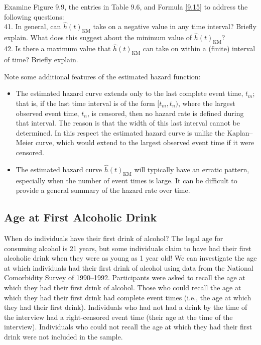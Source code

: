 \documentclass[
]{book}
\providecommand{\tightlist}{%
  \setlength{\itemsep}{0pt}\setlength{\parskip}{0pt}}
\begin{document}
Examine Figure 9.9, the entries in Table 9.6, and Formula \ref{9.15} to address the following questions:\\
41. In general, can \(\hat h(t)_{\mathrm{KM}}\) take on a negative value in any time interval? Briefly explain. What does this suggest about the minimum value of \(\hat h(t)_{\mathrm{KM}}\)?\\
42. Is there a maximum value that \(\hat h(t)_{\mathrm{KM}}\) can take on within a (finite) interval of time? Briefly explain.

Note some additional features of the estimated hazard function:

\begin{itemize}
\tightlist
\item
  The estimated hazard curve extends only to the last complete event time, \(t_m\); that is, if the last time interval is of the form \([t_m, t_n)\), where the largest observed event time, \(t_n\), is censored, then no hazard rate is defined during that interval. The reason is that the width of this last interval cannot be determined. In this respect the estimated hazard curve is unlike the Kaplan--Meier curve, which would extend to the largest observed event time if it were censored.\\
\item
  The estimated hazard curve \(\hat h(t)_{\mathrm{KM}}\) will typically have an erratic pattern, especially when the number of event times is large. It can be difficult to provide a general summary of the hazard rate over time.
\end{itemize}

\hypertarget{age-at-first-alcoholic-drink}{%
\subsection*{Age at First Alcoholic Drink}\label{age-at-first-alcoholic-drink}}

When do individuals have their first drink of alcohol? The legal age for consuming alcohol is 21 years, but some individuals claim to have had their first alcoholic drink when they were as young as 1 year old! We can investigate the age at which individuals had their first drink of alcohol using data from the National Comorbidity Survey of 1990--1992. Participants were asked to recall the age at which they had their first drink of alcohol. Those who could recall the age at which they had their first drink had complete event times (i.e., the age at which they had their first drink). Individuals who had not had a drink by the time of the interview had a right-censored event time (their age at the time of the interview). Individuals who could not recall the age at which they had their first drink were not included in the sample.
\end{document}
